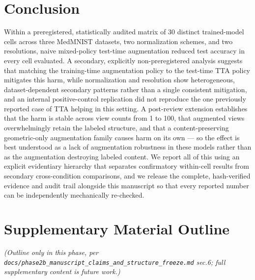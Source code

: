 \section{Conclusion}

Within a preregistered, statistically audited matrix of 30 distinct trained-model cells across three MedMNIST datasets, two normalization schemes, and two resolutions, naive mixed-policy test-time augmentation reduced test accuracy in every cell evaluated. A secondary, explicitly non-preregistered analysis suggests that matching the training-time augmentation policy to the test-time TTA policy mitigates this harm, while normalization and resolution show heterogeneous, dataset-dependent secondary patterns rather than a single consistent mitigation, and an internal positive-control replication did not reproduce the one previously reported case of TTA helping in this setting. A post-review extension establishes that the harm is stable across view counts from 1 to 100, that augmented views overwhelmingly retain the labeled structure, and that a content-preserving geometric-only augmentation family causes harm on its own --- so the effect is best understood as a lack of augmentation robustness in these models rather than as the augmentation destroying labeled content. We report all of this using an explicit evidentiary hierarchy that separates confirmatory within-cell results from secondary cross-condition comparisons, and we release the complete, hash-verified evidence and audit trail alongside this manuscript so that every reported number can be independently mechanically re-checked.

\section*{Supplementary Material Outline}

\emph{(Outline only in this phase, per \texttt{docs/\allowbreak phase2b\_\allowbreak manuscript\_\allowbreak claims\_\allowbreak and\_\allowbreak structure\_\allowbreak freeze.md} sec.6; full supplementary content is future work.)}


